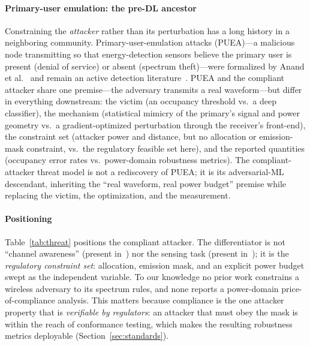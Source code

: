 \documentclass[review]{elsarticle}
\begin{document}
\paragraph{Primary-user emulation: the pre-DL ancestor} Constraining the
\emph{attacker} rather than its perturbation has a long history in a
neighboring community. Primary-user-emulation attacks (PUEA)---a malicious
node transmitting so that energy-detection sensors believe the primary user
is present (denial of service) or absent (spectrum theft)---were formalized
by Anand et al.~\cite{anand2008} and remain an active detection
literature~\cite{ambhika2024}. PUEA and the compliant attacker share one
premise---the adversary transmits a real waveform---but differ in everything
downstream: the victim (an occupancy threshold vs.\ a deep classifier), the
mechanism (statistical mimicry of the primary's signal and power geometry
vs.\ a gradient-optimized perturbation through the receiver's
front-end), the constraint set (attacker power and distance, but no
allocation or emission-mask constraint, vs.\ the regulatory feasible set
here), and the reported quantities (occupancy error rates vs.\ power-domain
robustness metrics). The compliant-attacker threat model is not a
rediscovery of PUEA; it is its adversarial-ML descendant, inheriting the
``real waveform, real power budget'' premise while replacing the victim,
the optimization, and the measurement.

\paragraph{Positioning} Table~\ref{tab:threat} positions the compliant
attacker. The differentiator is not ``channel awareness'' (present
in~\cite{sagduyu2021,radioshock2026}) nor the sensing task
(present in~\cite{liu2022,zheng2026}); it is the \emph{regulatory constraint
set}: allocation, emission mask, and an explicit power budget swept as the
independent variable. To our knowledge no prior work constrains a wireless
adversary to its spectrum rules, and none reports a power-domain
price-of-compliance analysis. This matters because compliance is the one
attacker property that is \emph{verifiable by regulators}: an attacker that
must obey the mask is within the reach of conformance testing, which makes
the resulting robustness metrics deployable (Section~\ref{sec:standards}).
\end{document}
